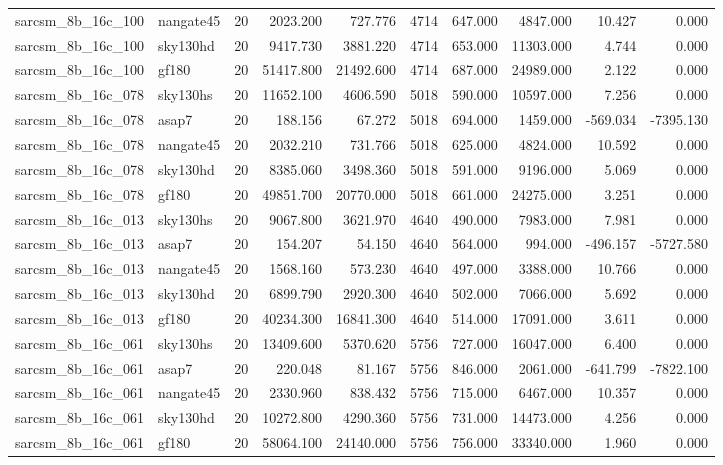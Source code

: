 \begin{longtable}{llrrrrrrrr}
sarcsm\_8b\_16c\_100 & nangate45 & 20 & 2023.200 & 727.776 & 4714 & 647.000 & 4847.000 & 10.427 & 0.000 \\
sarcsm\_8b\_16c\_100 & sky130hd & 20 & 9417.730 & 3881.220 & 4714 & 653.000 & 11303.000 & 4.744 & 0.000 \\
sarcsm\_8b\_16c\_100 & gf180 & 20 & 51417.800 & 21492.600 & 4714 & 687.000 & 24989.000 & 2.122 & 0.000 \\
sarcsm\_8b\_16c\_078 & sky130hs & 20 & 11652.100 & 4606.590 & 5018 & 590.000 & 10597.000 & 7.256 & 0.000 \\
sarcsm\_8b\_16c\_078 & asap7 & 20 & 188.156 & 67.272 & 5018 & 694.000 & 1459.000 & -569.034 & -7395.130 \\
sarcsm\_8b\_16c\_078 & nangate45 & 20 & 2032.210 & 731.766 & 5018 & 625.000 & 4824.000 & 10.592 & 0.000 \\
sarcsm\_8b\_16c\_078 & sky130hd & 20 & 8385.060 & 3498.360 & 5018 & 591.000 & 9196.000 & 5.069 & 0.000 \\
sarcsm\_8b\_16c\_078 & gf180 & 20 & 49851.700 & 20770.000 & 5018 & 661.000 & 24275.000 & 3.251 & 0.000 \\
sarcsm\_8b\_16c\_013 & sky130hs & 20 & 9067.800 & 3621.970 & 4640 & 490.000 & 7983.000 & 7.981 & 0.000 \\
sarcsm\_8b\_16c\_013 & asap7 & 20 & 154.207 & 54.150 & 4640 & 564.000 & 994.000 & -496.157 & -5727.580 \\
sarcsm\_8b\_16c\_013 & nangate45 & 20 & 1568.160 & 573.230 & 4640 & 497.000 & 3388.000 & 10.766 & 0.000 \\
sarcsm\_8b\_16c\_013 & sky130hd & 20 & 6899.790 & 2920.300 & 4640 & 502.000 & 7066.000 & 5.692 & 0.000 \\
sarcsm\_8b\_16c\_013 & gf180 & 20 & 40234.300 & 16841.300 & 4640 & 514.000 & 17091.000 & 3.611 & 0.000 \\
sarcsm\_8b\_16c\_061 & sky130hs & 20 & 13409.600 & 5370.620 & 5756 & 727.000 & 16047.000 & 6.400 & 0.000 \\
sarcsm\_8b\_16c\_061 & asap7 & 20 & 220.048 & 81.167 & 5756 & 846.000 & 2061.000 & -641.799 & -7822.100 \\
sarcsm\_8b\_16c\_061 & nangate45 & 20 & 2330.960 & 838.432 & 5756 & 715.000 & 6467.000 & 10.357 & 0.000 \\
sarcsm\_8b\_16c\_061 & sky130hd & 20 & 10272.800 & 4290.360 & 5756 & 731.000 & 14473.000 & 4.256 & 0.000 \\
sarcsm\_8b\_16c\_061 & gf180 & 20 & 58064.100 & 24140.000 & 5756 & 756.000 & 33340.000 & 1.960 & 0.000 \\

\end{longtable}
